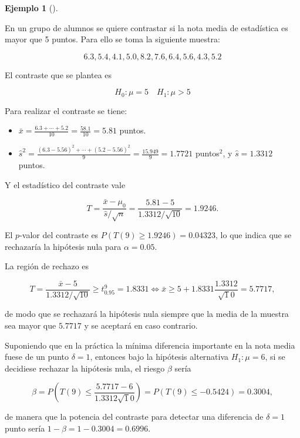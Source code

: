 \documentclass[
  a4paper,
]{scrreport}
\providecommand{\tightlist}{%
  \setlength{\itemsep}{0pt}\setlength{\parskip}{0pt}}\usepackage{longtable,booktabs,array}
\theoremstyle{plain}
\theoremstyle{definition}
\newtheorem{example}{Ejemplo}[chapter]
\theoremstyle{definition}
\theoremstyle{remark}
\begin{document}
\begin{example}[]\protect\hypertarget{exm-contraste-media-normal-varianza-desconocida}{}\label{exm-contraste-media-normal-varianza-desconocida}

En un grupo de alumnos se quiere contrastar si la nota media de
estadística es mayor que 5 puntos. Para ello se toma la siguiente
muestra:

\[
6.3, 5.4, 4.1, 5.0, 8.2, 7.6, 6.4, 5.6, 4.3, 5.2
\]

El contraste que se plantea es

\[H_0: \mu=5 \quad H_1: \mu>5\]

Para realizar el contraste se tiene:

\begin{itemize}
\tightlist
\item
  \(\bar x = \frac{6.3+\cdots+5.2}{10}=\frac{58.1}{10}=5.81\) puntos.
\item
  \(\hat s^2 = \frac{(6.3-5.56)^2+\cdots+(5.2-5.56)^2}{9} = \frac{15.949}{9}=1.7721\)
  puntos\(^2\), y \(\hat s=1.3312\) puntos.
\end{itemize}

Y el estadístico del contraste vale

\[
T=\frac{\bar x-\mu_0}{\hat s/\sqrt{n}} = \frac{5.81-5}{1.3312/\sqrt{10}}= 1.9246.
\]

El \(p\)-valor del contraste es \(P(T(9)\geq 1.9246) = 0.04323\), lo que
indica que se rechazaría la hipótesis nula para \(\alpha=0.05\).

La región de rechazo es

\[
T=\frac{\bar x-5}{1.3312/\sqrt{10}} \geq t^9_{0.95} = 1.8331 \Leftrightarrow \bar x \geq 5+1.8331\frac{1.3312}{\sqrt
10} = 5.7717,
\]

de modo que se rechazará la hipótesis nula siempre que la media de la
muestra sea mayor que \(5.7717\) y se aceptará en caso contrario.

Suponiendo que en la práctica la mínima diferencia importante en la nota
media fuese de un punto \(\delta=1\), entonces bajo la hipótesis
alternativa \(H_1:\mu=6\), si se decidiese rechazar la hipótesis nula,
el riesgo \(\beta\) sería

\[
\beta = P\left(T(9)\leq \frac{5.7717-6}{1.3312\sqrt 10}\right) = P(T(9)\leq -0.5424) = 0.3004,
\]

de manera que la potencia del contraste para detectar una diferencia de
\(\delta=1\) punto sería \(1-\beta=1-0.3004 = 0.6996\).

\end{example}
\end{document}
